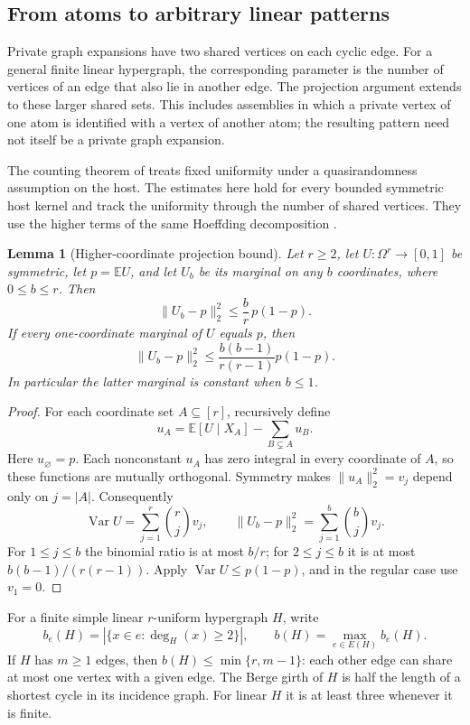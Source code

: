 \documentclass[a4paper,11pt,reqno]{amsart}
\theoremstyle{plain}
\newtheorem{lemma}[theorem]{Lemma}
\theoremstyle{definition}
\theoremstyle{remark}
\begin{document}
\subsection{From atoms to arbitrary linear patterns}

Private graph expansions have two shared vertices on each cyclic edge.
For a general finite linear hypergraph, the corresponding parameter is
the number of vertices of an edge that also lie in another edge.
The projection argument extends to these larger shared sets.
This includes assemblies in which a private vertex of one atom
is identified with a vertex of another atom; the resulting pattern
need not itself be a private graph expansion.

The counting theorem of \citet[Theorem~4]{knrs2010} treats fixed
uniformity under a quasirandomness assumption on the host.  The
estimates here hold for every bounded symmetric host kernel and
track the uniformity through the number of shared vertices.
They use the higher terms of the same Hoeffding decomposition
\citep{hoeffding1948}.

\begin{lemma}[Higher-coordinate projection bound]
\label{density-higher-projection}
Let $r\ge2$, let $U:\Omega^r\to[0,1]$ be symmetric, let $p=\mathbb EU$, and
let $U_b$ be its marginal on any $b$ coordinates, where $0\le b\le r$.
Then
\[
 \|U_b-p\|_2^2\le\frac br\,p(1-p).
\]
If every one-coordinate marginal of $U$ equals $p$, then
\[
 \|U_b-p\|_2^2
 \le\frac{b(b-1)}{r(r-1)}p(1-p).
\]
In particular the latter marginal is constant when $b\le1$.
\end{lemma}
\begin{proof}
For each coordinate set $A\subseteq[r]$, recursively define
\[
 u_A=\mathbb E[U\mid X_A]-\sum_{B\subsetneq A}u_B.
\]
Here $u_\varnothing=p$.  Each nonconstant $u_A$ has zero integral
in every coordinate of $A$, so these functions are mutually
orthogonal.  Symmetry makes $\|u_A\|_2^2=v_j$ depend only on
$j=|A|$.  Consequently
\[
 \operatorname{Var}U=\sum_{j=1}^r\binom rjv_j,
 \qquad
 \|U_b-p\|_2^2=\sum_{j=1}^b\binom bjv_j.
\]
For $1\le j\le b$ the binomial ratio is at most $b/r$; for
$2\le j\le b$ it is at most $b(b-1)/(r(r-1))$.  Apply
$\operatorname{Var}U\le p(1-p)$, and in the regular case use
$v_1=0$.
\end{proof}

For a finite simple linear $r$-uniform hypergraph $H$, write
\[
 b_e(H)=|\{x\in e:\deg_H(x)\ge2\}|,
 \qquad b(H)=\max_{e\in E(H)}b_e(H).
\]
If $H$ has $m\ge1$ edges, then
$b(H)\le\min\{r,m-1\}$: each other edge can share at most one
vertex with a given edge.  The Berge girth of $H$ is half the
length of a shortest cycle in its incidence graph.  For linear
$H$ it is at least three whenever it is finite.
\end{document}
